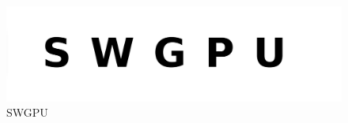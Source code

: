 \begin{center}
{\LARGE\bfseries\titulo}\\
\end{center}
\begin{center}
\autor\
\end{center}

\begin{figure}[h]
\centering
\includegraphics[width=0.7\linewidth]{../images/simple}
\caption[Logo de SWGPU]{SWGPU}
\label{fig:logo}
\end{figure}

\newpage


